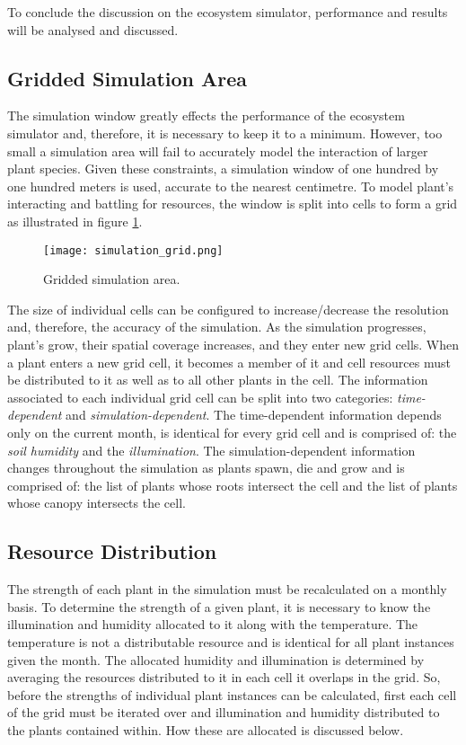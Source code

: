 To conclude the discussion on the ecosystem simulator, performance and results will be analysed and discussed.

\subsection{Gridded Simulation Area}

The simulation window greatly effects the performance of the ecosystem simulator and, therefore, it is necessary to keep it to a minimum. However, too small a simulation area will fail to accurately model the interaction of larger plant species. Given these constraints, a simulation window of one hundred by one hundred meters is used, accurate to the nearest centimetre. To model plant's interacting and battling for resources, the window is split into cells to form a grid as illustrated in figure \ref{fig:simulation_grid}.\\

\begin{figure}
\center
	\texttt{[image: simulation\_grid.png]}
	\caption{ Gridded simulation area.}	
	\label{fig:simulation_grid}
\end{figure}

The size of individual cells can be configured to increase/decrease the resolution and, therefore, the accuracy of the simulation. As the simulation progresses, plant's grow, their spatial coverage increases, and they enter new grid cells. When a plant enters a new grid cell, it becomes a member of it and cell resources must be distributed to it as well as to all other plants in the cell. The information associated to each individual grid cell can be split into two categories: \textit{time-dependent} and \textit{simulation-dependent}. The time-dependent information depends only on the current month, is identical for every grid cell and is comprised of: the \textit{soil humidity} and the \textit{illumination}. The simulation-dependent information changes throughout the simulation as plants spawn, die and grow and is comprised of: the list of plants whose roots intersect the cell and the list of plants whose canopy intersects the cell.

\subsection{Resource Distribution}

The strength of each plant in the simulation must be recalculated on a monthly basis. To determine the strength of a given plant, it is necessary to know the illumination and humidity allocated to it along with the temperature. The temperature is not a distributable resource and is identical for all plant instances given the month. The allocated humidity and illumination is determined by averaging the resources distributed to it in each cell it overlaps in the grid. So, before the strengths of individual plant instances can be calculated, first each cell of the grid must be iterated over and illumination and humidity distributed to the plants contained within. How these are allocated is discussed below.

